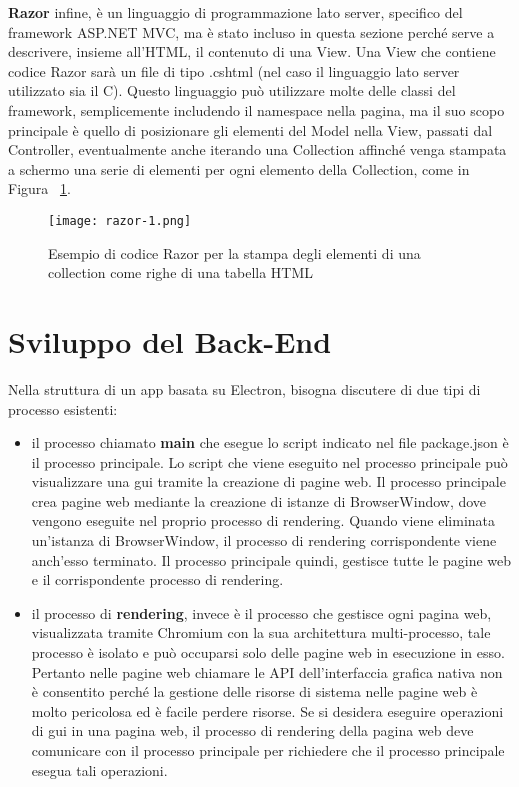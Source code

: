 \textbf{Razor}  infine, è un linguaggio di programmazione lato server, specifico del framework ASP.NET MVC, ma è stato incluso in questa sezione perché serve a descrivere, insieme all'HTML, il contenuto di una View.
Una View che contiene codice Razor sarà un file di tipo .cshtml (nel caso il linguaggio lato server utilizzato sia il C).
Questo linguaggio può utilizzare molte delle classi del framework, semplicemente includendo il namespace nella pagina, ma il suo scopo principale è quello di posizionare gli elementi del Model nella View, passati dal Controller, eventualmente anche iterando una Collection affinché venga stampata a schermo una serie di elementi per ogni elemento della Collection, come in Figura ~\ref{fig:Razor}.

\begin{figure}[H]
    \centering
    \texttt{[image: razor-1.png]}
    \caption{Esempio di codice Razor per la stampa degli elementi di una collection come righe di una tabella HTML}
    \label{fig:Razor}
\end{figure}



\newpage

\section{Sviluppo del Back-End}

Nella struttura di un app basata su Electron, bisogna discutere di due tipi di processo esistenti:
\begin{itemize}
	\item  il processo chiamato \textbf{main} che esegue lo script indicato nel file package.json è il processo principale. Lo script che viene eseguito nel processo principale può visualizzare una \Gls{gui} tramite la creazione di pagine web. Il processo principale crea pagine web mediante la creazione di istanze di BrowserWindow, dove vengono eseguite nel proprio processo di rendering. Quando viene eliminata un'istanza di BrowserWindow, il processo di rendering corrispondente viene anch'esso terminato. Il processo principale quindi, gestisce tutte le pagine web e il corrispondente processo di rendering.
	\item il processo di \textbf{rendering}, invece è il processo che gestisce ogni pagina web, visualizzata tramite Chromium con la sua architettura multi-processo, tale processo è isolato e può occuparsi solo delle pagine web in esecuzione in esso.
	Pertanto nelle pagine web chiamare le API dell'interfaccia grafica nativa non è consentito perché la gestione delle risorse di sistema nelle pagine web è molto pericolosa ed è facile perdere risorse. Se si desidera eseguire operazioni di \Gls{gui} in una pagina web, il processo di rendering della pagina web deve comunicare con il processo principale per richiedere che il processo principale esegua tali operazioni.
\end{itemize}

